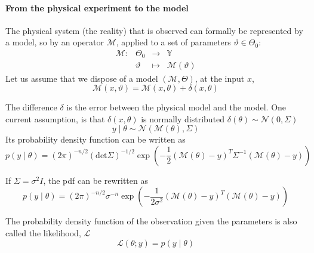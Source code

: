 \documentclass[a4paper,11pt]{article}
\newcommand{\Yspace}{\mathbb{Y}}
\theoremstyle{defi}
\numberwithin{thmCounter}{section}
\begin{document}
\paragraph{From the physical experiment to the model}
\label{ssec:inv_problem}
The physical system (the reality) that is observed can formally be represented by a model, so by an operator $\mathscr{M}$, applied to a set of parameters $\vartheta \in \Theta_0$:
\begin{equation*}
  \begin{array}{llll}
    \mathscr{M} :& \Theta_0 &\longrightarrow& \Yspace \\
                 & \vartheta & \longmapsto& \mathscr{M}(\vartheta)
  \end{array}
\end{equation*}
Let us assume that we dispose of a model $(\mathcal{M}, \Theta)$, at the input $x$, 
\begin{equation*}
    \mathscr{M}(x, \vartheta) = \mathcal{M}(x, \theta) + \delta(x,\theta)
\end{equation*}

The difference $\delta$ is the error between the physical model and the model.
One current assumption, is that $\delta(x, \theta)$ is normally distributed $\delta(\theta) \sim \mathcal{N}(0, \Sigma)$ 
\begin{equation}
  y\mid \theta \sim \mathcal{N}(\mathcal{M}(\theta), \Sigma)
\end{equation}
Its probability density function can be written as
\begin{equation}
  p(y\mid \theta) = (2\pi)^{-n/2}(\mathrm{det} \Sigma)^{-1/2}\exp\left(-\frac{1}{2}(\mathcal{M}(\theta) - y)^T\Sigma^{-1}(\mathcal{M}(\theta) - y)\right)
\end{equation}
\begin{remark}
  If $\Sigma = \sigma^2 I$, the pdf can be rewritten as
  \begin{equation*}
    p(y \mid \theta) = (2\pi)^{-n/2} \sigma^{-n} \exp\left(-\frac{1}{2\sigma^2}(\mathcal{M}(\theta) - y)^T(\mathcal{M}(\theta) - y)\right)
  \end{equation*}
\end{remark}

\begin{definition}
  The probability density function of the observation given the parameters is also called the likelihood, $\mathcal{L}$
  \begin{equation}
    \label{eq:likelihood_definition}
    \mathcal{L}(\theta;y) = p(y \mid \theta)
  \end{equation}
\end{definition}
\end{document}
